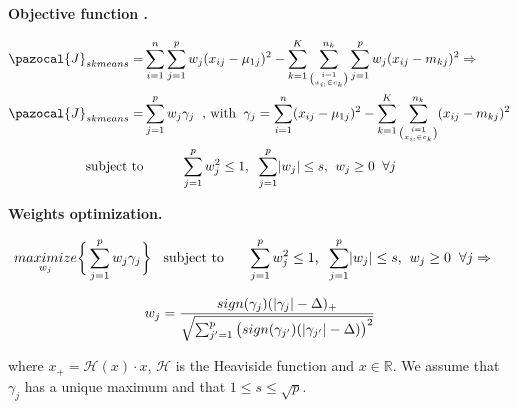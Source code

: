\documentclass[12pt]{article}
\renewcommand\cite{\citep}  %
\DeclarePairedDelimiter{\abs}{\lvert}{\rvert} %
\newcommand{\CJ}{\pazocal{J}}
\begin{document}
\noindent \textbf{Objective function \cite{witten2010framework}.} 
	
\begin{align}\nonumber
\CJ_{skmeans} =& \sum_{i=1}^{n}\sum_{j=1}^{p} w_{j}(x_{ij}-{\mu}_{1j})^2 - \sum_{k=1}^{K}\sum_{\binom{i=1}{x_{i:} \in c_k}}^{n_k}\sum_{j=1}^{p} w_{j}(x_{ij}-m_{kj})^2  \Rightarrow\\ \label{skmeansopt2}
\CJ_{skmeans} =&  \sum_{j=1}^{p} w_{j}\gamma_j \hphantom{x}\text{, with}\hphantom{x} 	\gamma_j = \sum_{i=1}^{n} (x_{ij}-{\mu}_{1j})^2 - \sum_{k=1}^{K}\sum_{\binom{i=1}{x_{i:} \in c_k}}^{n_k}(x_{ij}-m_{kj})^2\\
\nonumber
\text{subject to}& \hphantom{xxxxx} \sum_{j=1}^{p} w_{j}^{2} \leq 1 \text{,}\hphantom{x} \sum_{j=1}^{p} \abs{w_{j}} \leq s \text{,}\hphantom{x} w_{j} \geq 0\hphantom{x} \forall j 
\end{align}	

\noindent \textbf{Weights optimization.} 

\begin{align}\nonumber
\underset{w_j}{maximize}& \bigg\{ \sum_{j=1}^{p} w_{j}\gamma_j \bigg\} \hphantom{x,}
\text{subject to} \hphantom{xxx} \sum_{j=1}^{p} w_{j}^{2} \leq 1 \text{,}\hphantom{x} \sum_{j=1}^{p} \abs{w_{j}} \leq s \text{,}\hphantom{x} w_{j} \geq 0\hphantom{x} \forall j \Rightarrow
\end{align}	

\begin{align}\label{skmeansopt3}
w_{j} = \frac{sign(\gamma_{j})(\vphantom{x} \abs{\gamma_{j}}-\Delta)_{+}}{
	\sqrt{\sum_{j'=1}^{p}\big{(}sign(\gamma_{j'})(\vphantom{x} \abs{\gamma_{j'}}-\Delta)\big{)}^2}
}
\end{align}	

\noindent where $x_+ = \mathcal{H}(x)\cdot x$, $\mathcal{H}$ is the Heaviside function and $x \in \mathbb{R}$. We assume that $\gamma_j$ has a unique maximum and that $1 \leq s \leq \sqrt{p}$.
\end{document}
